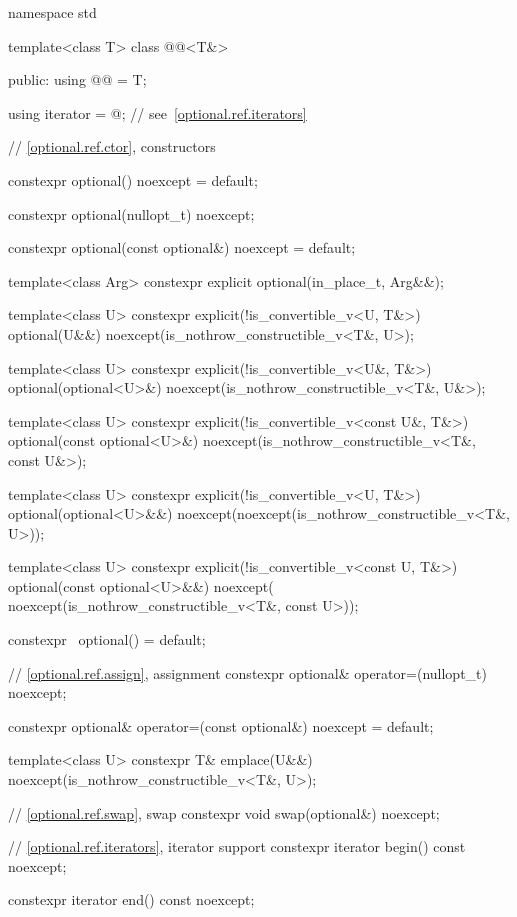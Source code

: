 \begin{codeblock}
namespace std {
  template<class T>
  class @@<T&> {
  public:
    using @@ = T;

    using iterator = @\impdef@; // see~\ref{optional.ref.iterators}

    // \ref{optional.ref.ctor}, constructors

    constexpr optional() noexcept = default;

    constexpr optional(nullopt_t) noexcept;

    constexpr optional(const optional&) noexcept = default;

    template<class Arg> constexpr explicit optional(in_place_t, Arg&&);

    template<class U>
    constexpr explicit(!is_convertible_v<U, T&>)
        optional(U&&) noexcept(is_nothrow_constructible_v<T&, U>);

    template<class U>
    constexpr explicit(!is_convertible_v<U&, T&>)
        optional(optional<U>&) noexcept(is_nothrow_constructible_v<T&, U&>);

    template<class U>
    constexpr explicit(!is_convertible_v<const U&, T&>)
        optional(const optional<U>&) noexcept(is_nothrow_constructible_v<T&, const U&>);

    template<class U>
    constexpr explicit(!is_convertible_v<U, T&>)
        optional(optional<U>&&) noexcept(noexcept(is_nothrow_constructible_v<T&, U>));

    template<class U>
    constexpr explicit(!is_convertible_v<const U, T&>)
        optional(const optional<U>&&) noexcept(
            noexcept(is_nothrow_constructible_v<T&, const U>));

    constexpr ~optional() = default;

    // \ref{optional.ref.assign}, assignment
    constexpr optional& operator=(nullopt_t) noexcept;

    constexpr optional& operator=(const optional&) noexcept = default;

    template<class U>
    constexpr T& emplace(U&&) noexcept(is_nothrow_constructible_v<T&, U>);

    // \ref{optional.ref.swap}, swap
    constexpr void swap(optional&) noexcept;

    // \ref{optional.ref.iterators}, iterator support
    constexpr iterator begin() const noexcept;

    constexpr iterator end() const noexcept;

}}
\end{codeblock}
